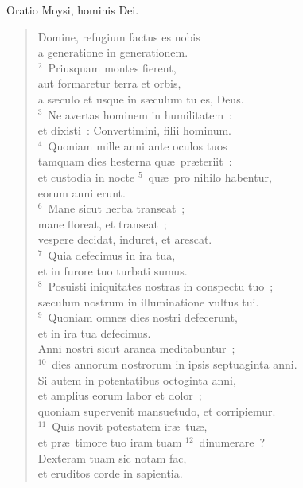 \bchapter
\lettrine[lines=3,image=true,loversize=0.05,lraise=-0.03]{O}{}ratio Moysi, hominis Dei. \begin{flushleft}\begin{verse}\vspace{6pt}Domine, refugium factus es nobis\\ a generatione in generationem.\\
${}^{2}$~Priusquam montes fierent,\\ aut formaretur terra et orbis,\\ a s\ae culo et usque in s\ae culum tu es, Deus.\\
${}^{3}$~Ne avertas hominem in humilitatem~:\\ et dixisti~: Convertimini, filii hominum.\\
${}^{4}$~Quoniam mille anni ante oculos tuos\\ tamquam dies hesterna qu\ae\ pr\ae teriit~:\\ et custodia in nocte
${}^{5}$~qu\ae\ pro nihilo habentur,\\ eorum anni erunt.\\
${}^{6}$~Mane sicut herba transeat~;\\ mane floreat, et transeat~;\\ vespere decidat, induret, et arescat.\\
${}^{7}$~Quia defecimus in ira tua,\\ et in furore tuo turbati sumus.\\
${}^{8}$~Posuisti iniquitates nostras in conspectu tuo~;\\ s\ae culum nostrum in illuminatione vultus tui.\\
${}^{9}$~Quoniam omnes dies nostri defecerunt,\\ et in ira tua defecimus.\\ Anni nostri sicut aranea meditabuntur~;\\
${}^{10}$~dies annorum nostrorum in ipsis septuaginta anni.\\ Si autem in potentatibus octoginta anni,\\ et amplius eorum labor et dolor~;\\ quoniam supervenit mansuetudo, et corripiemur.\\
${}^{11}$~Quis novit potestatem ir\ae\ tu\ae ,\\ et pr\ae\ timore tuo iram tuam
${}^{12}$~dinumerare~?\\ Dexteram tuam sic notam fac,\\ et eruditos corde in sapientia.\\

\end{verse}
\end{flushleft}
